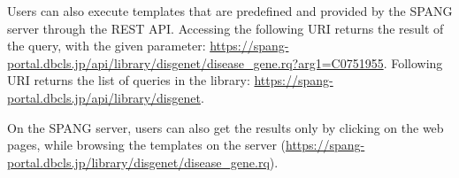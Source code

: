 \documentclass[runningheads]{llncs}
\begin{document}
Users can also execute templates that are predefined and provided by the SPANG server through the REST API.
Accessing the following URI returns the result of the query, with the given parameter:
\url{https://spang-portal.dbcls.jp/api/library/disgenet/disease_gene.rq?arg1=C0751955}. Following URI returns the list of queries in the library: \url{https://spang-portal.dbcls.jp/api/library/disgenet}.


On the SPANG server, users can also get the results only by clicking on the web pages, while browsing the templates on the server (\url{https://spang-portal.dbcls.jp/library/disgenet/disease_gene.rq}). 










\end{document}
